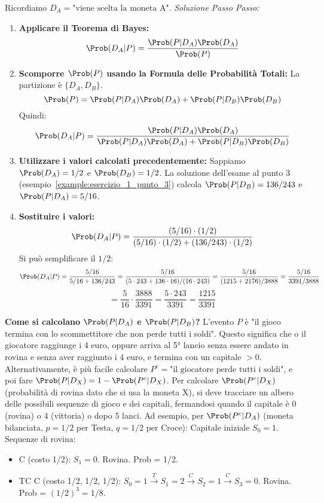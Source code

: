 \begin{example}
\noindent Ricordiamo $D_A = \text{"viene scelta la moneta A"}$.
\textit{Soluzione Passo Passo:}
\begin{enumerate}
    \item \textbf{Applicare il Teorema di Bayes:}
    \[ \Prob(D_A|P) = \frac{\Prob(P|D_A)\Prob(D_A)}{\Prob(P)} \]
    \item \textbf{Scomporre $\Prob(P)$ usando la Formula delle Probabilità Totali:}
    La partizione è $\{D_A, D_B\}$.
    \[ \Prob(P) = \Prob(P|D_A)\Prob(D_A) + \Prob(P|D_B)\Prob(D_B) \]
    Quindi:
    \[ \Prob(D_A|P) = \frac{\Prob(P|D_A)\Prob(D_A)}{\Prob(P|D_A)\Prob(D_A) + \Prob(P|D_B)\Prob(D_B)} \]
    \item \textbf{Utilizzare i valori calcolati precedentemente:}
    Sappiamo $\Prob(D_A) = 1/2$ e $\Prob(D_B) = 1/2$.
    La soluzione dell'esame al punto 3 (esempio~\ref{example:esercizio_1_punto_3}) calcola $\Prob(P|D_B) = 136/243$ e $\Prob(P|D_A) = 5/16$.
    \item \textbf{Sostituire i valori:}
    \[ \Prob(D_A|P) = \frac{(5/16) \cdot (1/2)}{(5/16) \cdot (1/2) + (136/243) \cdot (1/2)} \]
    Si può semplificare il $1/2$:
    \[ \Prob(D_A|P) = \frac{5/16}{5/16 + 136/243} = \frac{5/16}{(5 \cdot 243 + 136 \cdot 16)/(16 \cdot 243)} = \frac{5/16}{(1215 + 2176)/3888} = \frac{5/16}{3391/3888} \]
    \[ = \frac{5}{16} \cdot \frac{3888}{3391} = \frac{5 \cdot 243}{3391} = \frac{1215}{3391} \]
\end{enumerate}
\textbf{Come si calcolano $\Prob(P|D_A)$ e $\Prob(P|D_B)$?}
L'evento $P$ è "il gioco termina con lo scommettitore che non perde tutti i soldi". Questo significa che o il giocatore raggiunge i 4 euro, oppure arriva al 5° lancio senza essere andato in rovina e senza aver raggiunto i 4 euro, e termina con un capitale $>0$.
Alternativamente, è più facile calcolare $P^c = \text{"il giocatore perde tutti i soldi"}$, e poi fare $\Prob(P|D_X) = 1 - \Prob(P^c|D_X)$.
Per calcolare $\Prob(P^c|D_X)$ (probabilità di rovina dato che si usa la moneta X), si deve tracciare un albero delle possibili sequenze di gioco e dei capitali, fermandosi quando il capitale è 0 (rovina) o 4 (vittoria) o dopo 5 lanci.
Ad esempio, per $\Prob(P^c|D_A)$ (moneta bilanciata, $p=1/2$ per Testa, $q=1/2$ per Croce):
Capitale iniziale $S_0=1$.
Sequenze di rovina:
\begin{itemize}
    \item C (costo 1/2): $S_1=0$. Rovina. Prob = 1/2.
    \item TC C (costo 1/2, 1/2, 1/2): $S_0=1 \xrightarrow{T} S_1=2 \xrightarrow{C} S_2=1 \xrightarrow{C} S_3=0$. Rovina. Prob = $(1/2)^3 = 1/8$.

\end{itemize}
\end{example}
